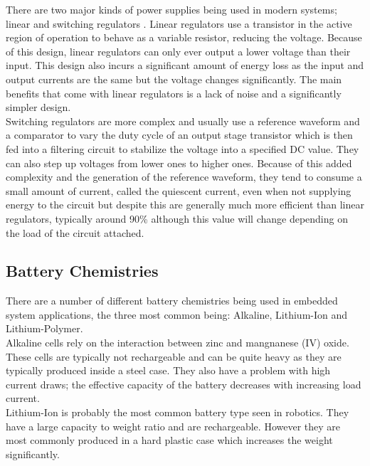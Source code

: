 \documentclass[12pt,openany,a4paper]{book}
\begin{document}
			There are two major kinds of power supplies being used in modern systems; linear and switching regulators \cite{TI2011}. Linear regulators use a transistor in the active region of operation to behave as a variable resistor, reducing the voltage. Because of this design, linear regulators can only ever output a lower voltage than their input. This design also incurs a significant amount of energy loss as the input and output currents are the same but the voltage changes significantly. The main benefits that come with linear regulators is a lack of noise and a significantly simpler design. \\
			
			Switching regulators are more complex and usually use a reference waveform and a comparator to vary the duty cycle of an output stage transistor which is then fed into a filtering circuit to stabilize the voltage into a specified DC value. They can also step up voltages from lower ones to higher ones. Because of this added complexity and the generation of the reference waveform, they tend to consume a small amount of current, called the quiescent current, even when not supplying energy to the circuit but despite this are generally much more efficient than linear regulators, typically around 90\% although this value will change depending on the load of the circuit attached. 
			
		\subsection{Battery Chemistries}
			There are a number of different battery chemistries being used in embedded system applications, the three most common being: Alkaline, Lithium-Ion and Lithium-Polymer. \\
			
			Alkaline cells rely on the interaction between zinc and mangnanese (IV) oxide. These cells are typically not rechargeable and can be quite heavy as they are typically produced inside a steel case. They also have a problem with high current draws; the effective capacity of the battery decreases with increasing load current. \\
			
			Lithium-Ion is probably the most common battery type seen in robotics. They have a large capacity to weight ratio and are rechargeable. However they are most commonly produced in a hard plastic case which increases the weight significantly. \\
			
\end{document}
